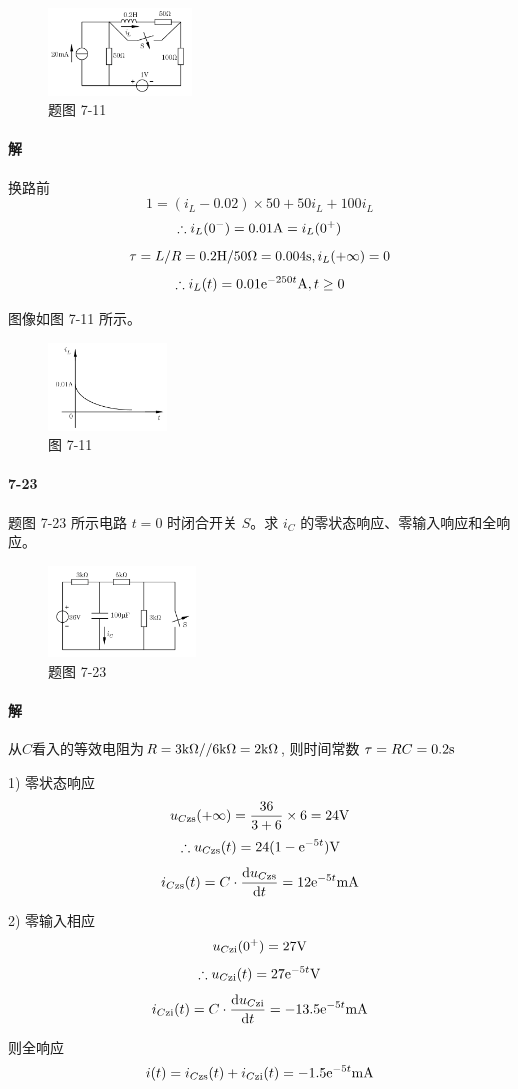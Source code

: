 \documentclass[hyperref, UTF8]{ctexart}
\newcommand{\volt}{{\rm V}}
\newcommand{\second}{{\rm s}}
\newcommand{\ampere}{{\rm A}}
\newcommand{\milliampere}{{\rm mA}}
\newcommand{\ohm}{\Omega}
\newcommand{\kiloohm}{{\rm k}\Omega}
\newcommand{\henry}{{\rm H}}
\newcommand{\D}{{\rm d}}
\newcommand{\E}{{\rm e}}
\begin{document}
\begin{figure}[!htb]
\centering
\includegraphics[width=0.340\textwidth]{p7-11.png}
\caption*{题图 7-11}
\end{figure}

\paragraph{解}
换路前
$$ 1 = (i_L - 0.02) \times 50 + 50 i_L + 100 i_L $$
$$ \therefore i_L(0^-) = 0.01\ampere = i_L(0^+) $$
$$ \tau = L/R = 0.2\henry / 50\ohm = 0.004\second, i_L(+\infty) = 0 $$
$$ \therefore i_L(t) = 0.01 \E ^{-250t} \ampere, t \ge 0 $$

图像如图 7-11 所示。

\begin{figure}[!htb]
\centering
\includegraphics[width=0.281\textwidth]{p7-11-sol.png}
\caption*{图 7-11}
\end{figure}

\paragraph{7-23}\label{7-23}
题图 7-23 所示电路 $t=0$ 时闭合开关 $S$。求 $i_C$ 的零状态响应、零输入响应和全响应。

\begin{figure}[!htb]
\centering
\includegraphics[width=0.349\textwidth]{p7-23.png}
\caption*{题图 7-23}
\end{figure}

\paragraph{解}
从$C$看入的等效电阻为$R = 3\kiloohm // 6\kiloohm = 2\kiloohm$, 则时间常数 $\tau = RC = 0.2\second$

1) 零状态响应
$$u_{C \rm zs}(+\infty) = \frac{36}{3+6} \times 6 = 24\volt$$
$$\therefore u_{C \rm zs}(t) = 24(1-\E ^{-5t})\volt $$
$$ i_{C \rm zs}(t) = C\cdot \frac{\D u_{C \rm zs}}{\D t} = 12 \E ^{-5t} \milliampere$$

2) 零输入相应
$$u_{C \rm zi}(0^+) = 27\volt$$
$$\therefore u_{C \rm zi}(t) = 27\E ^{-5t}\volt $$
$$ i_{C \rm zi}(t) = C\cdot \frac{\D u_{C \rm zi}}{\D t} = -13.5 \E ^{-5t} \milliampere$$

则全响应
$$i(t) = i_{C \rm zs}(t)+i_{C \rm zi}(t) = -1.5 \E ^{-5t} \milliampere$$
\end{document}
